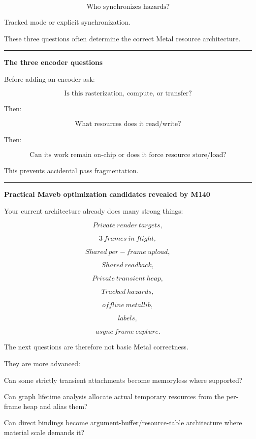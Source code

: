 \[
\boxed{
\text{Who synchronizes hazards?}
}
\]

Tracked mode or explicit synchronization.

These three questions often determine the correct Metal resource architecture.

\begin{center}\rule{0.5\linewidth}{0.5pt}\end{center}

\textbf{The three encoder questions}

Before adding an encoder ask:

\[
\boxed{
\text{Is this rasterization, compute, or transfer?}
}
\]

Then:

\[
\boxed{
\text{What resources does it read/write?}
}
\]

Then:

\[
\boxed{
\text{Can its work remain on-chip or does it force resource store/load?}
}
\]

This prevents accidental pass fragmentation.

\begin{center}\rule{0.5\linewidth}{0.5pt}\end{center}

\textbf{Practical Maveb optimization candidates revealed by M140}

Your current architecture already does many strong things:

\[
Private\ render\ targets,
\]

\[
3\ frames\ in\ flight,
\]

\[
Shared\ per-frame\ upload,
\]

\[
Shared\ readback,
\]

\[
Private\ transient\ heap,
\]

\[
Tracked\ hazards,
\]

\[
offline\ metallib,
\]

\[
labels,
\]

\[
async\ frame\ capture.
\]

The next questions are therefore not basic Metal correctness.

They are more advanced:

Can some strictly transient attachments become memoryless where supported?

Can graph lifetime analysis allocate actual temporary resources from the per-frame heap and alias them?

Can direct bindings become argument-buffer/resource-table architecture where material scale demands it?

